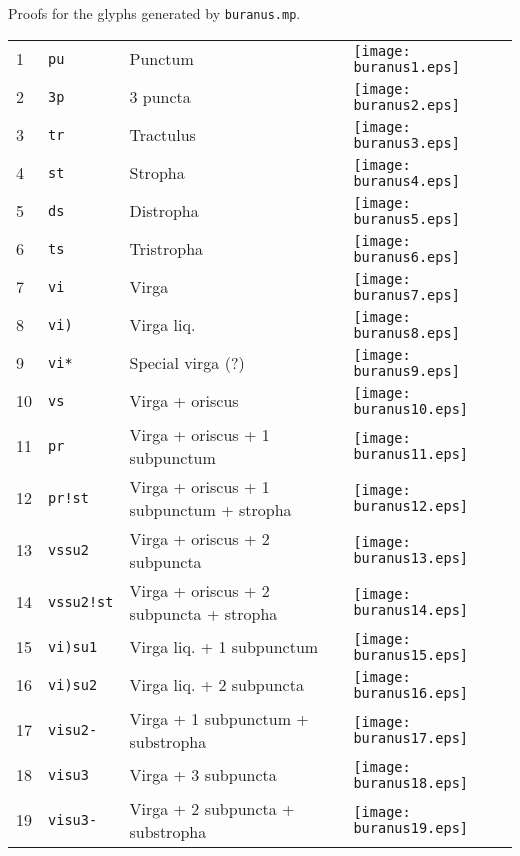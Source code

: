 \documentclass{scrarticle}
\begin{document}
Proofs for the glyphs generated by \texttt{buranus.mp}.

\vspace{1cm}

\begin{longtable}{l|l|l|l}
1 & \texttt{pu} & Punctum & \texttt{[image: buranus1.eps]} \\
2 & \texttt{3p} & 3 puncta & \texttt{[image: buranus2.eps]} \\
3 & \texttt{tr} & Tractulus & \texttt{[image: buranus3.eps]} \\
4 & \texttt{st} & Stropha & \texttt{[image: buranus4.eps]} \\
5 & \texttt{ds} & Distropha & \texttt{[image: buranus5.eps]} \\
6 & \texttt{ts} & Tristropha & \texttt{[image: buranus6.eps]} \\
7 & \texttt{vi} & Virga & \texttt{[image: buranus7.eps]} \\
8 & \texttt{vi)} & Virga liq. & \texttt{[image: buranus8.eps]} \\
9 & \texttt{vi*} & Special virga (?) & \texttt{[image: buranus9.eps]} \\
10 & \texttt{vs} & Virga + oriscus & \texttt{[image: buranus10.eps]} \\
11 & \texttt{pr} & Virga + oriscus + 1 subpunctum & \texttt{[image: buranus11.eps]} \\
12 & \texttt{pr!st} & Virga + oriscus + 1 subpunctum + stropha & \texttt{[image: buranus12.eps]} \\
13 & \texttt{vssu2} & Virga + oriscus + 2 subpuncta & \texttt{[image: buranus13.eps]} \\
14 & \texttt{vssu2!st} & Virga + oriscus + 2 subpuncta + stropha & \texttt{[image: buranus14.eps]} \\
15 & \texttt{vi)su1} & Virga liq. + 1 subpunctum & \texttt{[image: buranus15.eps]} \\
16 & \texttt{vi)su2} & Virga liq. + 2 subpuncta & \texttt{[image: buranus16.eps]} \\
17 & \texttt{visu2-} & Virga + 1 subpunctum + substropha & \texttt{[image: buranus17.eps]} \\
18 & \texttt{visu3} & Virga + 3 subpuncta & \texttt{[image: buranus18.eps]} \\
19 & \texttt{visu3-} & Virga + 2 subpuncta + substropha & \texttt{[image: buranus19.eps]} \\

\end{longtable}
\end{document}

